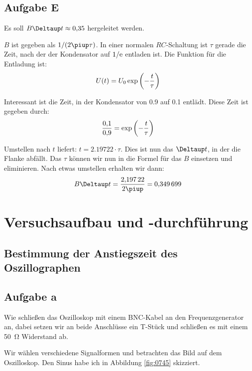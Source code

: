 \subsection{Aufgabe E}

Es soll $B \Deltaup t \approx \num{0.35}$ hergeleitet werden.

$B$ ist gegeben als $1/(2 \piup \tau)$. In einer normalen $RC$-Schaltung ist
$\tau$ gerade die Zeit, nach der der Kondensator auf $1/\mathrm e$ entladen ist. Die
Funktion für die Entladung ist:
\[
	U(t) = U_0 \exp\del{- \frac t\tau}
\]

Interessant ist die Zeit, in der Kondensator von \num{0.9} auf \num{0.1}
entlädt. Diese Zeit ist gegeben durch:
\[
	\frac{\num{0.1}}{\num{0.9}} = \exp\del{- \frac t\tau}
\]

Umstellen nach $t$ liefert: $t = \num{2.19722} \cdot \tau$. Dies ist nun das
$\Deltaup t$, in der die Flanke abfällt. Das $\tau$ können wir nun in die
Formel für das $B$ einsetzen und eliminieren. Nach etwas umstellen erhalten wir
dann:
\[
	B \Deltaup t = \frac{\num{2.19722}}{2 \piup} = \num{0.349699}
\]


\section{Versuchsaufbau und -durchführung}

\subsection{Bestimmung der Anstiegszeit des Oszillographen}

\subsection{Aufgabe a}

Wie schließen das Oszilloskop mit einem BNC-Kabel an den Frequenzgenerator an,
dabei setzen wir an beide Anschlüsse ein T-Stück und schließen es mit einem
\SI{50}{\ohm} Widerstand ab.

Wir wählen verschiedene Signalformen und betrachten das Bild auf dem Oszilloskop. Den Sinus habe ich in Abbildung \ref{fig:0745} skizziert.

